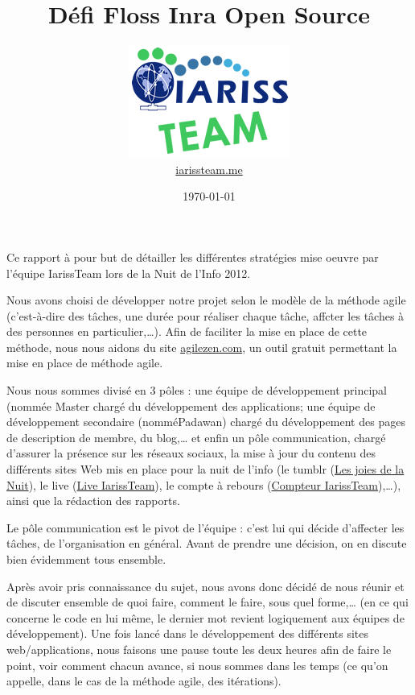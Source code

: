 \documentclass[12pt, a4paper]{article}
\title{Défi Floss Inra Open Source}
\newcommand{\espace}{\vspace{.8cm}}
\begin{document}
\author{\includegraphics{../_img/iariss_team.png} \\ {\sffamily \href{http://iarissteam.me}{iarissteam.me}}}
\date{\today}

\maketitle{}

{\sffamily Ce rapport à pour but de détailler les différentes stratégies mise oeuvre par l'équipe IarissTeam lors de la Nuit de l'Info 2012.} 

\espace{}
Nous avons choisi de développer notre projet selon le modèle de la méthode agile (c'est-à-dire des tâches, une durée pour réaliser chaque tâche, affcter les tâches à des personnes en particulier,\ldots{}). Afin de faciliter la mise en place de cette méthode, nous nous aidons du site \href{http://www.agilezen.com/}{agilezen.com}, un outil gratuit permettant la mise en place de méthode agile.

Nous nous sommes divisé en 3 pôles : une équipe de développement principal (nommée \og{}Master\fg{} chargé du développement des applications; une équipe de développement secondaire (nommé\og{}Padawan\fg{}) chargé du développement des pages de description de membre, du blog,\ldots{} et enfin un pôle communication, chargé d'assurer la présence sur les réseaux sociaux, la mise à jour du contenu des différents sites Web mis en place pour la nuit de l'info (le tumblr (\href{http://lesjoiesdelanuit.tumblr.com/}{Les joies de la Nuit}), le live (\href{http://live.iarissteam.me/}{Live IarissTeam}), le compte à rebours (\href{http://iarissteam.me/}{Compteur IarissTeam}),\ldots{}), ainsi que la rédaction des rapports.

Le pôle communication est le pivot de l'équipe : c'est lui qui décide d'affecter les tâches, de l'organisation en général. Avant de prendre une décision, on en discute bien évidemment tous ensemble.

Après avoir pris connaissance du sujet, nous avons donc décidé de nous réunir et de discuter ensemble de quoi faire, comment le faire, sous quel forme,\ldots{} (en ce qui concerne le code en lui même, le dernier mot revient logiquement aux équipes de développement). Une fois lancé dans le développement des différents sites web/applications, nous faisons une pause toute les deux heures afin de faire le point, voir comment chacun avance, si nous sommes dans les temps (ce qu'on appelle, dans le cas de la méthode agile, des \og{}itérations\fg{}).
\end{document}
